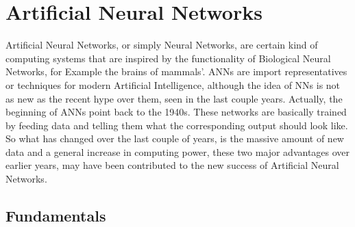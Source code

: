 \chapter{Artificial Neural Networks}\label{chapter:Related Work}
Artificial Neural Networks, or simply Neural Networks, are certain kind of computing systems that are inspired by the functionality of Biological Neural Networks, for Example the brains of mammals'. ANNs are import representatives or techniques for modern Artificial Intelligence, although the idea of NNs is not as new as the recent hype over them, seen in the last couple years. Actually, the beginning of ANNs point back to the 1940s. These networks are basically trained by feeding data and telling them what the corresponding output should look like. So what has changed over the last couple of years, is the massive amount of new data and a general increase in computing power, these two major advantages over earlier years, may have been contributed to the new success of Artificial Neural Networks.

\section{Fundamentals}

